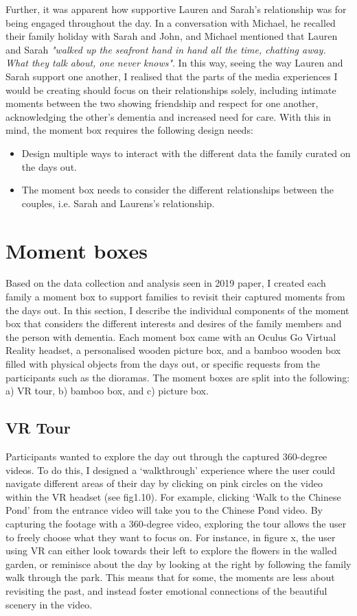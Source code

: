Further, it was apparent how supportive Lauren and Sarah's relationship was for being engaged throughout the day. In a conversation with Michael, he recalled their family holiday with Sarah and John, and Michael mentioned that Lauren and Sarah \textit{"walked up the seafront hand in hand all the time, chatting away. What they talk about, one never knows"}. In this way, seeing the way Lauren and Sarah support one another, I realised that the parts of the media experiences I would be creating should focus on their relationships solely, including intimate moments between the two showing friendship and respect for one another, acknowledging the other's dementia and increased need for care. With this in mind, the moment box requires the following design needs:

\begin{itemize}
    \item Design multiple ways to interact with the different data the family curated on the days out.
    \item The moment box needs to consider the different relationships between the couples, i.e. Sarah and Laurens's relationship.
\end{itemize}


\section{Moment boxes}
\label{MomentBoxes}
Based on the data collection and analysis seen in 2019 paper, I created each family a moment box to support families to revisit their captured moments from the days out. In this section, I describe the individual components of the moment box that considers the different interests and desires of the family members and the person with dementia. Each moment box came with an Oculus Go Virtual Reality headset, a personalised wooden picture box, and a bamboo wooden box filled with physical objects from the days out, or specific requests from the participants such as the dioramas. The moment boxes are split into the following: a) VR tour, b) bamboo box, and c) picture box.

\subsection{VR Tour}
\label{VRTour}
Participants wanted to explore the day out through the captured 360-degree videos. To do this, I designed a ‘walkthrough’ experience where the user could navigate different areas of their day by clicking on pink circles on the video within the VR headset (see fig1.10). For example, clicking ‘Walk to the Chinese Pond’ from the entrance video will take you to the Chinese Pond video. By capturing the footage with a 360-degree video, exploring the tour allows the user to freely choose what they want to focus on. For instance, in figure x, the user using VR can either look towards their left to explore the flowers in the walled garden, or reminisce about the day by looking at the right by following the family walk through the park. This means that for some, the moments are less about revisiting the past, and instead foster emotional connections of the beautiful scenery in the video. 

